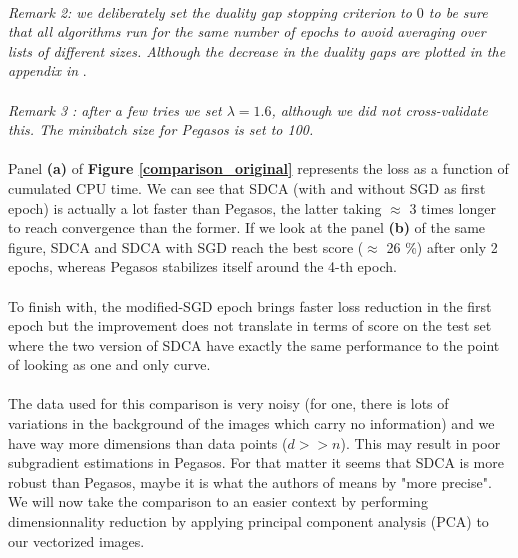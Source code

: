 \documentclass[10pt,a4paper]{article}
\begin{document}
\paragraph{}
\textit{Remark 2: we deliberately set the duality gap stopping criterion to $0$ to be sure that all algorithms run for the same number of epochs to avoid averaging over lists of different sizes. Although the decrease in the duality gaps are plotted in the appendix in }.

\paragraph{}
\textit{Remark 3 : after a few tries we set $\lambda=1.6$, although we did not cross-validate this. The minibatch size for Pegasos is set to 100.}


\paragraph{}
Panel \textbf{(a)} of \textbf{Figure \ref{comparison_original}} represents the loss as a function of cumulated CPU time. We can see that SDCA (with and without SGD as first epoch) is actually a lot faster than Pegasos, the latter taking $\approx$ 3 times longer to reach convergence than the former.  If we look at the panel \textbf{(b)} of the same figure, SDCA and SDCA with SGD reach the best score ($\approx$ 26 \%) after only 2 epochs, whereas Pegasos stabilizes itself around the 4-th epoch. 


\paragraph{}
To finish with, the modified-SGD epoch brings faster loss reduction in the first epoch but the improvement does not translate in terms of score on the test set where the two version of SDCA have exactly the same performance to the point of looking as one and only curve. 

\paragraph{}
The data used for this comparison is very noisy (for one, there is lots of variations in the background of the images which carry no information) and we have way more dimensions than data points ($d>>n$). This may result in poor subgradient estimations in Pegasos. For that matter it seems that SDCA is more robust than Pegasos, maybe it is what the authors of \cite{1} means by "more precise". We will now take the comparison to an easier context by performing dimensionnality reduction by applying principal component analysis (PCA) to our vectorized images. 
\end{document}
